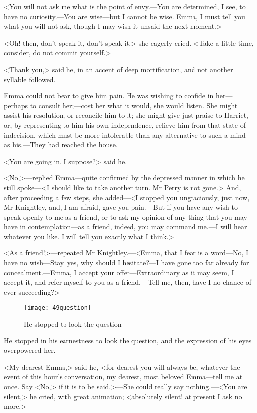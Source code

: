 <You will not ask me what is the point of envy.—You are determined, I see, to have no curiosity.—You are wise—but I cannot be wise. Emma, I must tell you what you will not ask, though I may wish it unsaid the next moment.>

<Oh! then, don't speak it, don't speak it,> she eagerly cried. <Take a little time, consider, do not commit yourself.>

<Thank you,> said he, in an accent of deep mortification, and not another syllable followed.

Emma could not bear to give him pain. He was wishing to confide in her—perhaps to consult her;—cost her what it would, she would listen. She might assist his resolution, or reconcile him to it; she might give just praise to Harriet, or, by representing to him his own independence, relieve him from that state of indecision, which must be more intolerable than any alternative to such a mind as his.—They had reached the house.

<You are going in, I suppose?> said he.

<No,>—replied Emma—quite confirmed by the depressed manner in which he still spoke—<I should like to take another turn. Mr Perry is not gone.> And, after proceeding a few steps, she added—<I stopped you ungraciously, just now, Mr Knightley, and, I am afraid, gave you pain.—But if you have any wish to speak openly to me as a friend, or to ask my opinion of any thing that you may have in contemplation—as a friend, indeed, you may command me.—I will hear whatever you like. I will tell you exactly what I think.>

<As a friend!>—repeated Mr Knightley.—<Emma, that I fear is a word—No, I have no wish—Stay, yes, why should I hesitate?—I have gone too far already for concealment.—Emma, I accept your offer—Extraordinary as it may seem, I accept it, and refer myself to you as a friend.—Tell me, then, have I no chance of ever succeeding?>

\begin{figure}[tbph]
\centering
\texttt{[image: 49question]}
\caption{He stopped to look the question}
\end{figure}

He stopped in his earnestness to look the question, and the expression of his eyes overpowered her.

<My dearest Emma,> said he, <for dearest you will always be, whatever the event of this hour's conversation, my dearest, most beloved Emma—tell me at once. Say <No,> if it is to be said.>—She could really say nothing.—<You are silent,> he cried, with great animation; <absolutely silent! at present I ask no more.>

